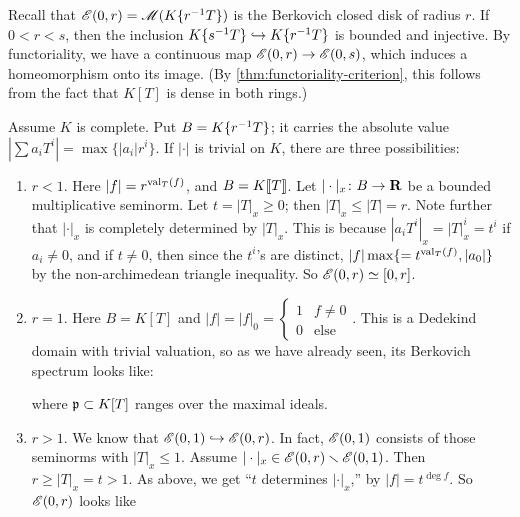 Recall that $\mathscr{E}(0,r)=\operatorname{\mathscr{M}}(K\{ r^{-1} T \})$ is the Berkovich closed 
disk of radius $r$. If $0<r<s$, then the inclusion 
$K\{ s^{-1} T \}\hookrightarrow K\{ r^{-1} T \}$ is bounded and 
injective. By functoriality, we have a continuous map $\mathscr{E}(0,r)\to \mathscr{E}(0,s)$, 
which induces a homeomorphism onto its image. (By 
\autoref{thm:functoriality-criterion}, this follows from the fact that $K[T]$ 
is dense in both rings.)

Assume $K$ is complete. Put $B=K\{ r^{-1} T \}$; it carries the absolute 
value $|\sum a_i T^i| = \max \{|a_i| r^i\}$. If $|\cdot|$ is trivial on $K$, 
there are three possibilities: 
\begin{enumerate}
\item
$r<1$. Here $|f|=r^{\operatorname{val}_T(f)}$, and $B=K\llbracket T\rrbracket$. Let 
$|\cdot|_x\colon B\to \mathbf{R}$ be a bounded multiplicative seminorm. Let 
$t=|T|_x\geqslant 0$; then $|T|_x \leqslant |T|=r$. Note further that 
$|\cdot|_x$ is completely determined by $|T|_x$. This is because 
$|a_i T^i|_x = |T|_x^i=t^i$ if $a_i\ne 0$, and if $t\ne 0$, then since the 
$t^i$'s are distinct, $|f|\max\{=t^{\operatorname{val}_T(f)},|a_0|\}$ by the 
non-archimedean triangle inequality. So $\mathscr{E}(0,r) \simeq [0,r]$. 

\item
$r=1$. Here $B=K[T]$ and 
$|f|=|f|_0=\begin{cases} 1 & f\ne 0 \\ 0 & \text{else}\end{cases}$. This is a 
Dedekind domain with trivial valuation, so as we have already seen, its 
Berkovich spectrum looks like: 
\begin{center}
\end{center}
where $\mathfrak{p}\subset K[T]$ ranges over the maximal ideals. 

\item
$r>1$. We know that $\mathscr{E}(0,1)\hookrightarrow \mathscr{E}(0,r)$. In fact, $\mathscr{E}(0,1)$ 
consists of those seminorms with $|T|_x\leqslant 1$. Assume 
$|\cdot|_x\in \mathscr{E}(0,r)\smallsetminus \mathscr{E}(0,1)$. Then $r\geqslant |T|_x=t>1$. As 
above, we get ``$t$ determines $|\cdot|_x$,'' by 
$|f|=t^{\deg f}$. So $\mathscr{E}(0,r)$ looks like 
\begin{center}
\end{center}
\end{enumerate}

